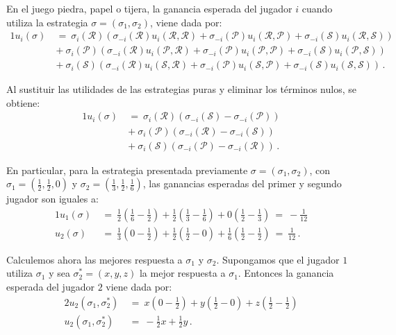 En el juego piedra, papel o tijera, la ganancia esperada del jugador $i$ cuando utiliza la estrategia $\sigma = (\sigma_1, \sigma_2)$, viene dada por:
\begin{alignat}{1}
	u_i(\sigma)\ &=\ \sigma_i(\mathcal{R}) \left( \sigma_{-i}(\mathcal{R}) u_i(\mathcal{R}, \mathcal{R}) + \sigma_{-i}(\mathcal{P}) u_i(\mathcal{R}, \mathcal{P})+ \sigma_{-i}(\mathcal{S}) u_i(\mathcal{R}, \mathcal{S}) \right) \\ \nonumber
    &+\ \sigma_i(\mathcal{P}) \left(\sigma_{-i}(\mathcal{R}) u_i(\mathcal{P}, \mathcal{R}) + \sigma_{-i}(\mathcal{P}) u_i(\mathcal{P}, \mathcal{P})+ \sigma_{-i}(\mathcal{S}) u_i(\mathcal{P}, \mathcal{S})\right) \\ \nonumber
	&+\ \sigma_i(\mathcal{S}) \left(  \sigma_{-i}(\mathcal{R})  u_i(\mathcal{S}, \mathcal{R}) + \sigma_{-i}(\mathcal{P}) u_i(\mathcal{S}, \mathcal{P})+ \sigma_{-i}(\mathcal{S}) u_i(\mathcal{S}, \mathcal{S})\right)\,.
\end{alignat}

Al sustituir las utilidades de las estrategias puras y eliminar los términos nulos, se obtiene:
\begin{alignat}{1}
	u_i(\sigma)\
	&=\ \sigma_i(\mathcal{R}) \left(\sigma_{-i}(\mathcal{S}) - \sigma_{-i}(\mathcal{P}) \right) \\ \nonumber
    &+\ \sigma_i(\mathcal{P}) \left(\sigma_{-i}(\mathcal{R}) - \sigma_{-i}(\mathcal{S}) \right) \\ \nonumber
	&+\ \sigma_i(\mathcal{S}) \left(\sigma_{-i}(\mathcal{P}) - \sigma_{-i}(\mathcal{R}) \right)\,.
\end{alignat}

En particular, para la estrategia presentada previamente $\sigma = (\sigma_1, \sigma_2)$, con $\sigma_1 = \left( \frac{1}{2}, \frac{1}{2}, 0 \right)$ y $\sigma_2 = \left(\frac{1}{3}, \frac{1}{2}, \frac{1}{6} \right)$, las ganancias esperadas del primer y segundo jugador son iguales a:
\begin{alignat}{1}
    u_1(\sigma)\ &=\ \frac{1}{2} \left(\frac{1}{6} - \frac{1}{2}\right) + \frac{1}{2} \left( \frac{1}{3} -\frac{1}{6} \right) + 0 \left( \frac{1}{2} - \frac{1}{3} \right)\ =\ -\frac{1}{12} \\
    u_2(\sigma)\ &=\ \frac{1}{3}\left(0 -\frac{1}{2} \right) + \frac{1}{2} \left( \frac{1}{2} - 0 \right) + \frac{1}{6} \left( \frac{1}{2} - \frac{1}{2} \right)\ =\ \frac{1}{12}\,.
\end{alignat}

Calculemos ahora las mejores respuesta a $\sigma_1$ y $\sigma_2$. Supongamos que el jugador $1$ utiliza $\sigma_1$ y sea $\sigma^*_2 = (x, y, z)$ la mejor respuesta a $\sigma_1$. Entonces la ganancia esperada del jugador $2$ viene dada por:
\begin{alignat}{2}
u_2(\sigma_1, \sigma^*_2)\ &=\ x\left(0 -\frac{1}{2}\right) + y\left(\frac{1}{2} - 0\right) + z\left(\frac{1}{2} - \frac{1}{2}\right) \\
u_2(\sigma_1, \sigma^*_2)\ &=\ -\frac{1}{2}x + \frac{1}{2}y \,.
\end{alignat}

